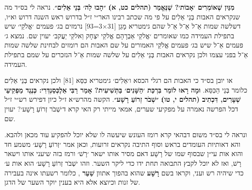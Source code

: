 \documentclass[12pt, openany]{book}
\newcommand{\sethebfont}{
\fontsize{10.5pt}{13.1pt} \selectfont
}
\newcommand{\twocol}[1]{
	{\sethebfont \begin{multicols}{2}
			#1
	\end{multicols}}	
}
\begin{document}
\twocol{\textbf{מִנַּיִן שֶׁאוֹמְרִים ׳אָבוֹת׳? שֶׁנֶּאֱמַר {\small (תהלים כט, א)}׃ ״הָבוּ לַה׳ בְּנֵי אֵלִים״}. נראה לי בס״ד מה שנקראים האבות בְּנֵי אֵלִים על פי מה שכתב רבינו האר״י ז״ל בדרוש ראש השנה דרוש וא״ו, דשלשה שמות אֵ־ל אֵ־ל אֵ־ל שהם גימטריא מָגֵן {\small [31×3=93]} נרמזים בג׳ פעמים ׳אֱלֹקֵי׳ שיש בתפילת העמידה כמו שאומרים ׳אֱלקֵי אַבְרָהָם אֱלקֵי יִצְחָק וֵאלקֵי יַעֲקב׳ יעוין שם. נמצא ג׳ פעמים אֵ־ל שיש בג׳ פעמים אֱלֹקֵי האמורים על שם האבות הם רומזים לבחינת שלשה שמות אֵ־ל בפני עצמו ולכן נקראים האבות בְּנֵי אֵלִים על שלשה שמות אֵ־ל הנזכרים על שמם בתפילת העמידה.\par או יובן בס״ד כי האבות הם רגלי הכסא ו׳אֵלִים׳ גימטריא כִּסֵּא {\small [81]} ולכן נקראים בְּנֵי אֵלִים כלומר בְּנֵי הַכִּסֵּא.
\textbf{וּמָה רָאוּ לוֹמַר בִּרְכַּת ׳הַשָּׁנִים׳ בַּתְּשִׁיעִית? אָמַר רַבִּי אַלֶכְּסַנְדְּרִי: כְּנֶגֶד מַפְקִיעֵי שְׁעָרִים, דִּכְתִיב {\small (תהלים י, טו)}׃ ״שְׁבֹר זְרוֹעַ רָשָׁע״}. הקשה מהרש״א ז״ל כיון דפירש רש״י ז״ל דכל הפרשה נאמרה על מפקיעי שערים, אמאי מייתי רק האי קרא ד׳שְׁבֹר זְרוֹעַ רָשָׁע׳? יעוין שם.\par ונראה לי בס״ד משום דבהאי קרא רומז העונש שיעשה לו שלא יוכל להפקיע עוד מכאן ולהבא. והא דאותיות העומדים בראש וסוף התיבה נקראים זרועות, וכאן אמר ׳זְרוֹעַ רָשָׁע׳ משמע חד והוא אות עי״ן שבסוף שמו של רָשָׁע דאם מסיר אותו ישאר ׳רָשׁ׳ ורמז בזה שיעני אותו וישאר רָשׁ, ואז לא יוכל לקבץ התבואה תחת ידו כדי ליקר השער. וזהו ׳שְׁבֹר זְרוֹעַ רָשָׁע׳ הוא אות ע׳ כדי שיהיה רש ועני, וקראו בשם \textbf{רָשָׁע} שהוא בהפוך אתוון \textbf{שַׁעַר} , כלומר רשעתו אינה בעבירה של זנות וכיוצא אלא היא בענין יוקר השער של הדגן.
\clearpage}
\end{document}

